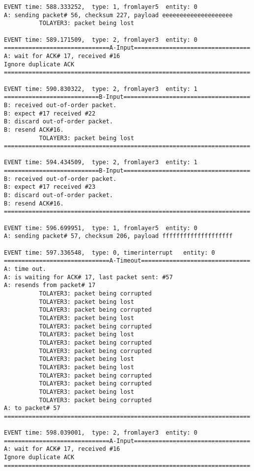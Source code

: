 \documentclass[12pt]{article}
\begin{document}
\begin{verbatim}
EVENT time: 588.333252,  type: 1, fromlayer5  entity: 0
A: sending packet# 56, checksum 227, payload eeeeeeeeeeeeeeeeeeee
          TOLAYER3: packet being lost

EVENT time: 589.171509,  type: 2, fromlayer3  entity: 0
==============================A-Input=================================
A: wait for ACK# 17, received #16
Ignore duplicate ACK
======================================================================

EVENT time: 590.830322,  type: 2, fromlayer3  entity: 1
===========================B-Input====================================
B: received out-of-order packet.
B: expect #17 received #22
B: discard out-of-order packet.
B: resend ACK#16.
          TOLAYER3: packet being lost
======================================================================

EVENT time: 594.434509,  type: 2, fromlayer3  entity: 1
===========================B-Input====================================
B: received out-of-order packet.
B: expect #17 received #23
B: discard out-of-order packet.
B: resend ACK#16.
======================================================================

EVENT time: 596.699951,  type: 1, fromlayer5  entity: 0
A: sending packet# 57, checksum 206, payload ffffffffffffffffffff

EVENT time: 597.336548,  type: 0, timerinterrupt   entity: 0
==============================A-Timeout===============================
A: time out. 
A: is waiting for ACK# 17, last packet sent: #57
A: resends from packet# 17 
          TOLAYER3: packet being corrupted
          TOLAYER3: packet being lost
          TOLAYER3: packet being corrupted
          TOLAYER3: packet being lost
          TOLAYER3: packet being corrupted
          TOLAYER3: packet being lost
          TOLAYER3: packet being corrupted
          TOLAYER3: packet being corrupted
          TOLAYER3: packet being lost
          TOLAYER3: packet being lost
          TOLAYER3: packet being corrupted
          TOLAYER3: packet being corrupted
          TOLAYER3: packet being lost
          TOLAYER3: packet being corrupted
A: to packet# 57
======================================================================

EVENT time: 598.039001,  type: 2, fromlayer3  entity: 0
==============================A-Input=================================
A: wait for ACK# 17, received #16
Ignore duplicate ACK
======================================================================


\end{verbatim}
\end{document}
